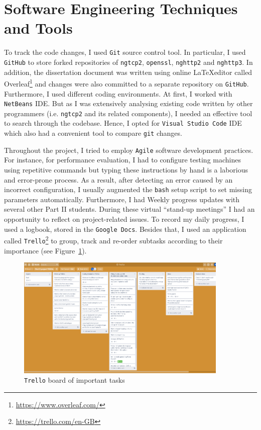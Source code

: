 \documentclass[12pt,a4paper,twoside,openright]{report}
\begin{document}
\section{Software Engineering Techniques and Tools}
    To track the code changes, I used \texttt{Git} source control tool.
    In particular, I used \texttt{GitHub} to store forked repositories of \texttt{ngtcp2}, \texttt{openssl}, \texttt{nghttp2} and \texttt{nghttp3}.
    In addition, the dissertation document was written using online \LaTeX  editor called Overleaf\footnote{\url{https://www.overleaf.com/}} and changes were also committed to a separate repository on \texttt{GitHub}.
    Furthermore, I used different coding environments.
    At first, I worked with \texttt{NetBeans} IDE.
    But as I was extensively analysing existing code written by other programmers (i.e. \texttt{ngtcp2} and its related components), I needed an effective tool to search through the codebase.
    Hence, I opted for \texttt{Visual Studio Code} IDE which also had a convenient tool to compare \texttt{git} changes.
    
    
    Throughout the project, I tried to employ \texttt{Agile} software development practices.
    For instance, for performance evaluation, I had to configure testing machines using repetitive commands but typing these instructions by hand is a laborious and error-prone process.
    As a result, after detecting an error caused by an incorrect configuration, I usually augmented the \texttt{bash} setup script to set missing parameters automatically.
    Furthermore, I had Weekly progress updates with several other Part II students.
    During these virtual \enquote{stand-up meetings} I had an opportunity to reflect on project-related issues.
    To record my daily progress, I used a logbook, stored in the \texttt{Google Docs}.
    Besides that, I used an application called \texttt{Trello}\footnote{\url{https://trello.com/en-GB}} to group, track and re-order subtasks according to their importance (see Figure~\ref{fig:Trello_board}).

    \begin{figure}[ht]
    \centering
    \includegraphics[width=0.9\textwidth]{figs/Trello_board.PNG}
    \caption{\texttt{Trello} board of important tasks}
    \label{fig:Trello_board}
    \end{figure}
    
\end{document}
